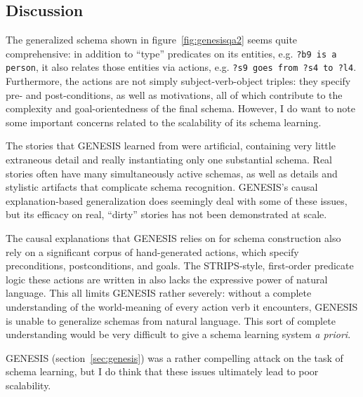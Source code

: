 \subsection{Discussion}

The generalized schema shown in figure~\ref{fig:genesisqa2} seems quite comprehensive: in addition to ``type'' predicates on its entities, e.g. \texttt{?b9 is a person}, it also relates those entities via actions, e.g. \texttt{?s9 goes from ?s4 to ?l4}. Furthermore, the actions are not simply subject-verb-object triples: they specify pre- and post-conditions, as well as motivations, all of which contribute to the complexity and goal-orientedness of the final schema. However, I do want to note some important concerns related to the scalability of its schema learning.

The stories that GENESIS learned from were artificial, containing very little extraneous detail and really instantiating only one substantial schema. Real stories often have many simultaneously active schemas, as well as details and stylistic artifacts that complicate schema recognition. GENESIS's causal explanation-based generalization does seemingly deal with some of these issues, but its efficacy on real, ``dirty'' stories has not been demonstrated at scale.

The causal explanations that GENESIS relies on for schema construction also rely on a significant corpus of hand-generated actions, which specify preconditions, postconditions, and goals. The STRIPS-style, first-order predicate logic these actions are written in also lacks the expressive power of natural language. This all limits GENESIS rather severely: without a complete understanding of the world-meaning of every action verb it encounters, GENESIS is unable to generalize schemas from natural language. This sort of complete understanding would be very difficult to give a schema learning system \textit{a priori}.

GENESIS (section~\ref{sec:genesis}) was a rather compelling attack on the task of schema learning, but I do think that these issues ultimately lead to poor scalability.
